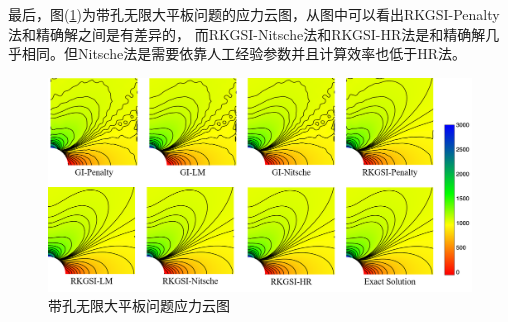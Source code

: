 最后，图(\ref{Hstress})为带孔无限大平板问题的应力云图，从图中可以看出RKGSI-Penalty法和精确解之间是有差异的，
而RKGSI-Nitsche法和RKGSI-HR法是和精确解几乎相同。但Nitsche法是需要依靠人工经验参数并且计算效率也低于HR法。
\begin{figure}[!h]
\centering
\includegraphics[scale=0.5]{figure/hole/hole.stress.png}
\caption{带孔无限大平板问题应力云图}\label{Hstress}
\end{figure}
  

